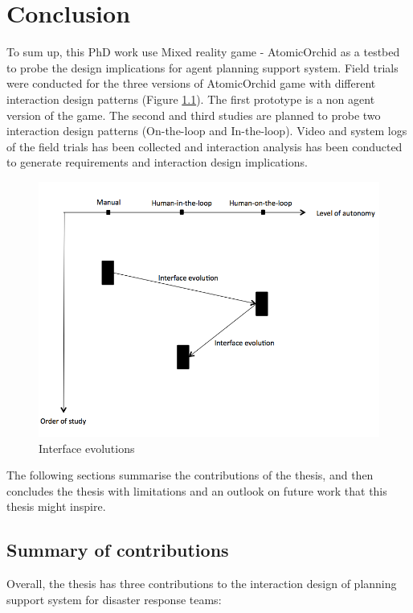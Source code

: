 \chapter{Conclusion}
To sum up, this PhD work use Mixed reality game - AtomicOrchid as a testbed to probe the design implications for agent planning support system. Field trials were conducted for the three versions of AtomicOrchid game with different interaction design patterns (Figure \ref{fig:connections}). The first prototype is a non agent version of the game. The second and third studies are planned to probe two interaction design patterns (On-the-loop and In-the-loop). Video and system logs of the field trials has been collected and interaction analysis has been conducted to generate requirements and interaction design implications. \\

\begin{figure}[H]
  \centering
  \includegraphics[width=1\textwidth]{img/conclusion/studies}
  \caption{Interface evolutions}
  \label{fig:connections}
\end{figure}

The following sections summarise the contributions of the thesis, and then concludes the thesis with limitations and an outlook on future work that this thesis might inspire.\\


\section{Summary of contributions}
Overall, the thesis has three contributions to the interaction design of planning support system for disaster response teams:\\

